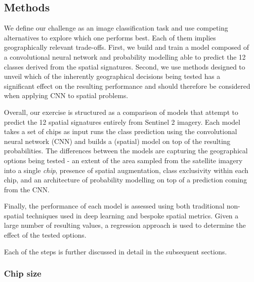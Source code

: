 \documentclass[]{interact}
\theoremstyle{plain}%
\theoremstyle{definition}
\theoremstyle{remark}
\begin{document}
\subsection{Methods}


We define our challenge as an image classification task and use competing alternatives
to explore which one performs best. Each of them implies geographically relevant
trade-offs. First, we build and train a model composed of a convolutional neural network
and probability modelling able to predict the 12 classes derived from the spatial
signatures. Second, we use methods designed to unveil which of the inherently
geographical decisions being tested has a significant effect on the resulting
performance and should therefore be considered when applying CNN to spatial
problems.

Overall, our exercise is structured as a comparison of models that attempt to
predict the 12 spatial signatures entirely from Sentinel 2 imagery. Each model takes
a set of chips as input runs the class prediction using the convolutional neural
network (CNN) and builds a (spatial) model on top of the resulting probabilities. The
differences between the models are capturing the geographical options being tested - an
extent of the area sampled from the satellite imagery into a single \textit{chip},
presence of spatial augmentation, class exclusivity within each chip, and an
architecture of probability modelling on top of a prediction coming from the CNN.

Finally, the performance of each model is assessed using both traditional non-spatial
techniques used in deep learning and bespoke spatial metrics. Given a large number of
resulting values, a regression approach is used to determine the effect of the tested
options.

Each of the steps is further discussed in detail in the subsequent sections.

\subsubsection{Chip size}

\end{document}
